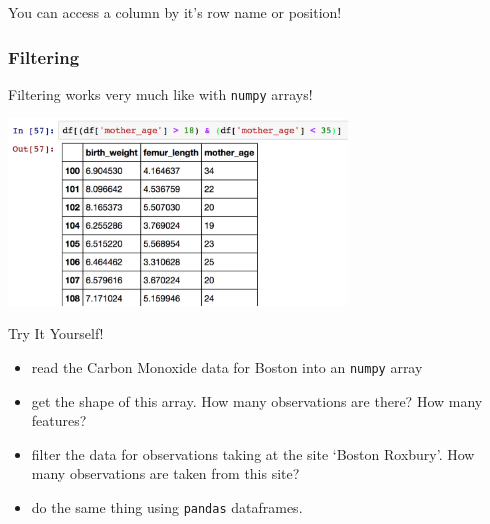 \documentclass[12pt,t]{beamer}
\begin{document}
\begin{frame}[fragile]
\begin{itemize}
{\begin{center}
\end{center}
You can access a column by it's row name or position!
}
\end{itemize}
\end{frame}

\begin{frame}[fragile]
  \frametitle{Filtering}
Filtering works very much like with \texttt{numpy} arrays!
\begin{center}
\includegraphics[width=90mm]{filtering}
\end{center}
\end{frame}

\begin{frame}{Try It Yourself!}
\begin{itemize}
\item read the Carbon Monoxide data for Boston into an \texttt{numpy} array
\item get the shape of this array. How many observations are there? How many features?
\item filter the data for observations taking at the site `Boston Roxbury'. How many observations are taken from this site?
\item do the same thing using \texttt{pandas} dataframes.
\end{itemize}
\end{frame}


\end{document}
